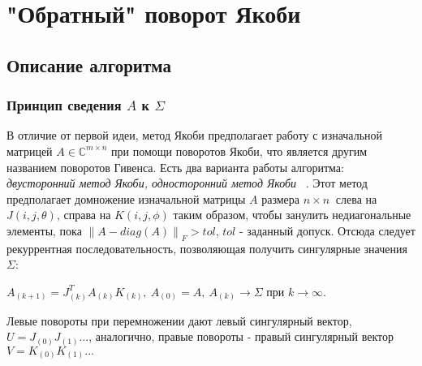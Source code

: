 \newpage
\section{"Обратный" поворот Якоби}

\subsection{Описание алгоритма}

\subsubsection{Принцип сведения $A$ к $\Sigma$}
В отличие от первой идеи, метод Якоби предполагает работу с изначальной матрицей $A\in \mathbb{C}^{m\times n}$ при помощи поворотов Якоби, что является другим названием поворотов Гивенса. Есть два варианта работы алгоритма:\textit{ двусторонний метод Якоби, односторонний метод Якоби} ~\cite{Dongarra2018}.
Этот метод предполагает домножение изначальной матрицы $A$ размера $n\times n \ $ слева на $J(i,j,\theta)$, справа на $K(i,j,\phi)$ таким образом, чтобы занулить недиагональные элементы, пока $\left\| A - diag(A) \right\|_F > tol$, $tol$ - заданный допуск. 
Отсюда следует рекуррентная последовательность, позволяющая получить сингулярные значения $\Sigma$:
\begin{center}
    $A_{(k+1)} = J^T_{(k)}A_{(k)}K_{(k)}, \ A_{(0)}= A, \ A_{(k)}\longrightarrow\Sigma \text{ при } k\to\infty$.
\end{center}

Левые повороты при перемножении дают левый сингулярный вектор, $U=J_{(0)}J_{(1)}...$, аналогично, правые повороты - правый сингулярный вектор $V=K_{(0)}K_{(1)}...$

